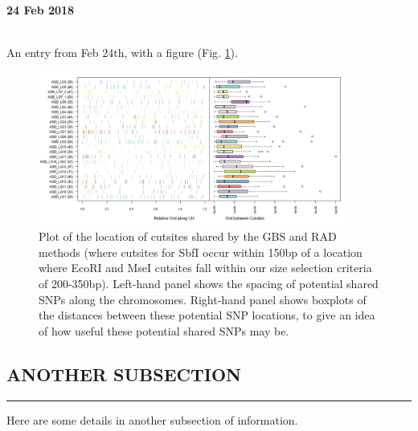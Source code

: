 \hrulefill
\begin{large}\textbf{24 Feb 2018}\end{large} \\
An entry from Feb 24th, with a figure (Fig. \ref{fig:cutsite-locations}).

\begin{figure}[ht]
\includegraphics[width=0.9\textwidth]
{figures/insilico_cutsite_locations.jpeg}\caption{\label{fig:cutsite-locations} Plot of the location of cutsites shared by the GBS and RAD methods (where cutsites for SbfI occur within 150bp of a location where EcoRI and MseI cutsites fall within our size selection criteria of 200-350bp). Left-hand panel shows the spacing of potential shared SNPs along the chromosomes. Right-hand panel shows boxplots of the distances between these potential SNP locations, to give an idea of how useful these potential shared SNPs may be.}
\end{figure}

\subsection*{ANOTHER SUBSECTION}
\hrule
Here are some details in another subsection of information.



